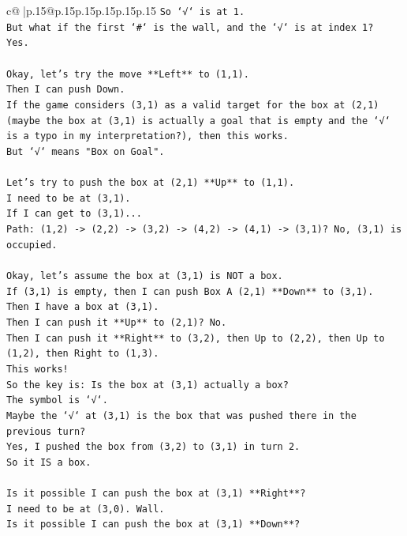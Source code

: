 \documentclass{article}
\begin{document}
{\begin{supertabular}{c@{$\;$}|p{.15\linewidth}@{}p{.15\linewidth}p{.15\linewidth}p{.15\linewidth}p{.15\linewidth}p{.15\linewidth}}
{{{\texttt{So `√` is at 1.} \\
\texttt{But what if the first `\#` is the wall, and the `√` is at index 1?} \\
\texttt{Yes.} \\
\\ 
\texttt{Okay, let's try the move **Left** to (1,1).} \\
\texttt{Then I can push Down.} \\
\texttt{If the game considers (3,1) as a valid target for the box at (2,1) (maybe the box at (3,1) is actually a goal that is empty and the `√` is a typo in my interpretation?), then this works.} \\
\texttt{But `√` means "Box on Goal".} \\
\\ 
\texttt{Let's try to push the box at (2,1) **Up** to (1,1).} \\
\texttt{I need to be at (3,1).} \\
\texttt{If I can get to (3,1)...} \\
\texttt{Path: (1,2) {-}> (2,2) {-}> (3,2) {-}> (4,2) {-}> (4,1) {-}> (3,1)? No, (3,1) is occupied.} \\
\\ 
\texttt{Okay, let's assume the box at (3,1) is NOT a box.} \\
\texttt{If (3,1) is empty, then I can push Box A (2,1) **Down** to (3,1).} \\
\texttt{Then I have a box at (3,1).} \\
\texttt{Then I can push it **Up** to (2,1)? No.} \\
\texttt{Then I can push it **Right** to (3,2), then Up to (2,2), then Up to (1,2), then Right to (1,3).} \\
\texttt{This works!} \\
\texttt{So the key is: Is the box at (3,1) actually a box?} \\
\texttt{The symbol is `√`.} \\
\texttt{Maybe the `√` at (3,1) is the box that was pushed there in the previous turn?} \\
\texttt{Yes, I pushed the box from (3,2) to (3,1) in turn 2.} \\
\texttt{So it IS a box.} \\
\\ 
\texttt{Is it possible I can push the box at (3,1) **Right**?} \\
\texttt{I need to be at (3,0). Wall.} \\
\texttt{Is it possible I can push the box at (3,1) **Down**?} \\
}}}
\end{supertabular}}
\end{document}
